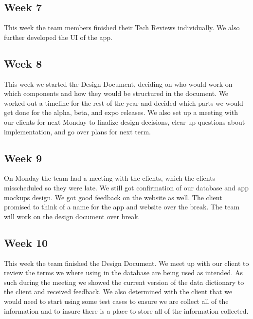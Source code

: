 \documentclass[onecolumn, draftclsnofoot,10pt, compsoc]{IEEEtran}
\begin{document}
\subsection{Week 7}
This week the team members finished their Tech Reviews individually. We also further developed the UI of the app.

\subsection{Week 8}
This week we started the Design Document, deciding on who would work on which components and how they would be structured in the document. We worked out a timeline for the rest of the year and decided which parts we would get done for the alpha, beta, and expo releases. We also set up a meeting with our clients for next Monday to finalize design decisions, clear up questions about implementation, and go over plans for next term.

\subsection{Week 9}
On Monday the team had a meeting with the clients, which the clients misscheduled so they were late. We still got confirmation of our database and app mockups design. We got good feedback on the website as well. The client promised to think of a name for the app and website over the break. The team will work on the design document over break.

\subsection{Week 10}
This week the team finished the Design Document. We meet up with our client to review the terms we where using in the database are being used as intended. As such during the meeting we showed the current version of the data dictionary to the client and received feedback. We also determined with the client that we would need to start using some test cases to ensure we are collect all of the information and to insure there is a place to store all of the information collected.  

\clearpage
\end{document}
